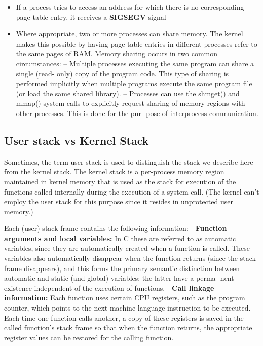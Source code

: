 \documentclass[
]{article}
\providecommand{\tightlist}{%
  \setlength{\itemsep}{0pt}\setlength{\parskip}{0pt}}
\begin{document}
\begin{itemize}
\tightlist
\item
  If a process tries to access an address for which there is no
  corresponding page-table entry, it receives a \textbf{SIGSEGV} signal
\item
  Where appropriate, two or more processes can share memory. The kernel
  makes this possible by having page-table entries in different
  processes refer to the same pages of RAM. Memory sharing occurs in two
  common circumstances: -- Multiple processes executing the same program
  can share a single (read- only) copy of the program code. This type of
  sharing is performed implicitly when multiple programs execute the
  same program file (or load the same shared library). -- Processes can
  use the shmget() and mmap() system calls to explicitly request sharing
  of memory regions with other processes. This is done for the pur- pose
  of interprocess communication.
\end{itemize}

\hypertarget{user-stack-vs-kernel-stack}{%
\subsection{User stack vs Kernel
Stack}\label{user-stack-vs-kernel-stack}}

Sometimes, the term user stack is used to distinguish the stack we
describe here from the kernel stack. The kernel stack is a per-process
memory region maintained in kernel memory that is used as the stack for
execution of the functions called internally during the execution of a
system call. (The kernel can't employ the user stack for this purpose
since it resides in unprotected user memory.)

Each (user) stack frame contains the following information: -
\textbf{Function arguments and local variables:} In C these are referred
to as automatic variables, since they are automatically created when a
function is called. These variables also automatically disappear when
the function returns (since the stack frame disappears), and this forms
the primary semantic distinction between automatic and static (and
global) variables: the latter have a perma- nent existence independent
of the execution of functions. - \textbf{Call linkage information:} Each
function uses certain CPU registers, such as the program counter, which
points to the next machine-language instruction to be executed. Each
time one function calls another, a copy of these registers is saved in
the called function's stack frame so that when the function returns, the
appropriate register values can be restored for the calling function.
\end{document}
